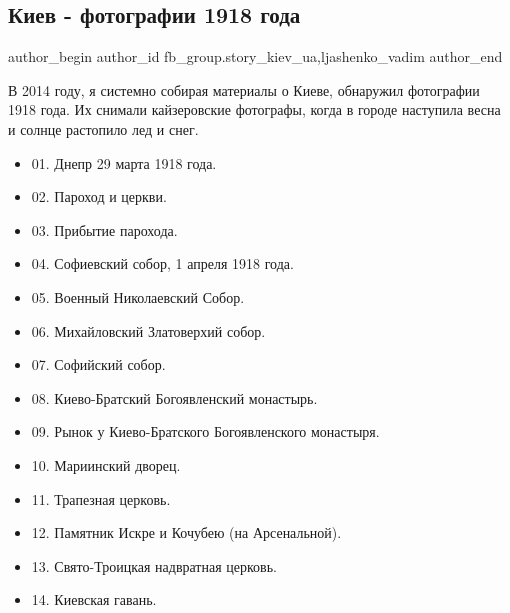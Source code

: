  
 
 
 
 
 
\subsection{Киев - фотографии 1918 года}
\label{sec:04_12_2021.fb.fb_group.story_kiev_ua.1.kiev_foto_1918}
 
\ifcmt
 author_begin
   author_id fb_group.story_kiev_ua,ljashenko_vadim
 author_end
\fi

В 2014 году, я системно собирая материалы о Киеве, обнаружил фотографии 1918
года. Их снимали кайзеровские фотографы, когда в городе наступила весна и
солнце растопило лед и снег.


\begin{itemize}
  \item 01. Днепр 29 марта 1918 года.
  \item 02. Пароход и церкви.
  \item 03. Прибытие парохода.
  \item 04. Софиевский собор, 1 апреля 1918 года.
  \item 05. Военный Николаевский Собор.
  \item 06. Михайловский Златоверхий собор.
  \item 07. Софийский собор.
  \item 08. Киево-Братский Богоявленский монастырь.
  \item 09. Рынок у Киево-Братского Богоявленского монастыря.
  \item 10. Мариинский дворец.
  \item 11. Трапезная церковь.
  \item 12. Памятник Искре и Кочубею (на Арсенальной).
  \item 13. Свято-Троицкая надвратная церковь.
  \item 14. Киевская гавань.
\end{itemize}


